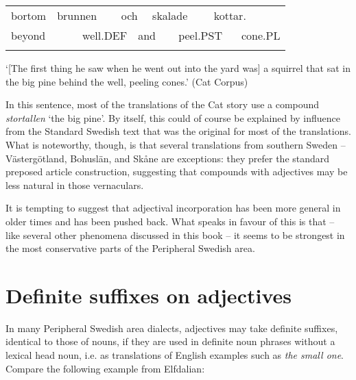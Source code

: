 \begin{tabular}{llllllllll}
\lsptoprule
bortom & \multicolumn{2}{l}{brunnen

} & \multicolumn{2}{l}{och

} & \multicolumn{2}{l}{skalade

} & \multicolumn{2}{l}{kottar.

} & \\
\multicolumn{2}{l}{beyond

} & \multicolumn{2}{l}{well.DEF

} & \multicolumn{2}{l}{and

} & \multicolumn{2}{l}{peel.PST

} & \multicolumn{2}{l}{cone.PL

}\\
\lspbottomrule
\end{tabular}

\begin{styleTranslation}
‘[The first thing he saw when he went out into the yard was] a squirrel that sat in the big pine behind the well, peeling cones.’ (Cat Corpus)

\end{styleTranslation}

\begin{styleBodyTextFirst}
In this sentence, most of the translations of the Cat story use a compound \textit{stortallen} ‘the big pine’. By itself, this could of course be explained by influence from the Standard Swedish text that was the original for most of the translations. What is noteworthy, though, is that several translations from southern Sweden – Västergötland, Bohuslän, and Skåne are exceptions: they prefer the standard preposed article construction, suggesting that compounds with adjectives may be less natural in those vernaculars.

\end{styleBodyTextFirst}

\begin{styleBodytextC}
It is tempting to suggest that adjectival incorporation has been more general in older times and has been pushed back. What speaks in favour of this is that – like several other phenomena discussed in this book – it seems to be strongest in the most conservative parts of the Peripheral Swedish area. 

\end{styleBodytextC}

\section{\rmfamily\bfseries Definite suffixes on adjectives}
\label{bkm:Ref155519944}
\begin{styleBodyTextFirst}
In many Peripheral Swedish area dialects, adjectives may take definite suffixes, identical to those of nouns, if they are used in definite noun phrases without a lexical head noun, i.e. as translations of English examples such as \textit{the small one}. Compare the following example from Elfdalian:

\end{styleBodyTextFirst}

